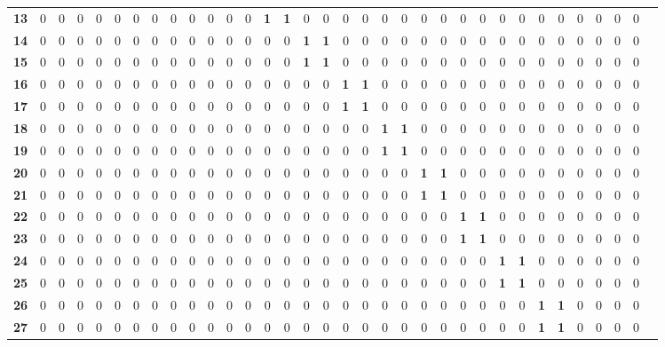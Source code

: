\documentclass[runningheads, a4paper, 10pt]{llncs}
\begin{document}
{\begin{longtabu}{cccccccccccccccccccccccccccccccccc}
\bf{13} & 0 & 0 & 0 & 0 & 0 & 0 & 0 & 0 & 0 & 0 & 0 & 0 & \bf1 & \bf1 & 0 & 0 & 0 & 0 & 0 & 0 & 0 & 0 & 0 & 0 & 0 & 0 & 0 & 0 & 0 & 0 & 0  & 0\\
\bf{14} & 0 & 0 & 0 & 0 & 0 & 0 & 0 & 0 & 0 & 0 & 0 & 0 & 0 & 0 & \bf1 & \bf1 & 0 & 0 & 0 & 0 & 0 & 0 & 0 & 0 & 0 & 0 & 0 & 0 & 0 & 0 & 0  & 0\\
\bf{15} & 0 & 0 & 0 & 0 & 0 & 0 & 0 & 0 & 0 & 0 & 0 & 0 & 0 & 0 & \bf1 & \bf1 & 0 & 0 & 0 & 0 & 0 & 0 & 0 & 0 & 0 & 0 & 0 & 0 & 0 & 0 & 0  & 0\\
\bf{16} & 0 & 0 & 0 & 0 & 0 & 0 & 0 & 0 & 0 & 0 & 0 & 0 & 0 & 0 & 0 & 0 & \bf1 & \bf1 & 0 & 0 & 0 & 0 & 0 & 0 & 0 & 0 & 0 & 0 & 0 & 0 & 0  & 0\\
\bf{17} & 0 & 0 & 0 & 0 & 0 & 0 & 0 & 0 & 0 & 0 & 0 & 0 & 0 & 0 & 0 & 0 & \bf1 & \bf1 & 0 & 0 & 0 & 0 & 0 & 0 & 0 & 0 & 0 & 0 & 0 & 0 & 0  & 0\\
\bf{18} & 0 & 0 & 0 & 0 & 0 & 0 & 0 & 0 & 0 & 0 & 0 & 0 & 0 & 0 & 0 & 0 & 0 & 0 & \bf1 & \bf1 & 0 & 0 & 0 & 0 & 0 & 0 & 0 & 0 & 0 & 0 & 0  & 0\\
\bf{19} & 0 & 0 & 0 & 0 & 0 & 0 & 0 & 0 & 0 & 0 & 0 & 0 & 0 & 0 & 0 & 0 & 0 & 0 & \bf1 & \bf1 & 0 & 0 & 0 & 0 & 0 & 0 & 0 & 0 & 0 & 0 & 0  & 0\\
\bf{20} & 0 & 0 & 0 & 0 & 0 & 0 & 0 & 0 & 0 & 0 & 0 & 0 & 0 & 0 & 0 & 0 & 0 & 0 & 0 & 0 & \bf1 & \bf1 & 0 & 0 & 0 & 0 & 0 & 0 & 0 & 0 & 0  & 0\\
\bf{21} & 0 & 0 & 0 & 0 & 0 & 0 & 0 & 0 & 0 & 0 & 0 & 0 & 0 & 0 & 0 & 0 & 0 & 0 & 0 & 0 & \bf1 & \bf1 & 0 & 0 & 0 & 0 & 0 & 0 & 0 & 0 & 0  & 0\\
\bf{22} & 0 & 0 & 0 & 0 & 0 & 0 & 0 & 0 & 0 & 0 & 0 & 0 & 0 & 0 & 0 & 0 & 0 & 0 & 0 & 0 & 0 & 0 & \bf1 & \bf1 & 0 & 0 & 0 & 0 & 0 & 0 & 0  & 0\\
\bf{23} & 0 & 0 & 0 & 0 & 0 & 0 & 0 & 0 & 0 & 0 & 0 & 0 & 0 & 0 & 0 & 0 & 0 & 0 & 0 & 0 & 0 & 0 & \bf1 & \bf1 & 0 & 0 & 0 & 0 & 0 & 0 & 0  & 0\\
\bf{24} & 0 & 0 & 0 & 0 & 0 & 0 & 0 & 0 & 0 & 0 & 0 & 0 & 0 & 0 & 0 & 0 & 0 & 0 & 0 & 0 & 0 & 0 & 0 & 0 & \bf1 & \bf1 & 0 & 0 & 0 & 0 & 0  & 0\\
\bf{25} & 0 & 0 & 0 & 0 & 0 & 0 & 0 & 0 & 0 & 0 & 0 & 0 & 0 & 0 & 0 & 0 & 0 & 0 & 0 & 0 & 0 & 0 & 0 & 0 & \bf1 & \bf1 & 0 & 0 & 0 & 0 & 0  & 0\\
\bf{26} & 0 & 0 & 0 & 0 & 0 & 0 & 0 & 0 & 0 & 0 & 0 & 0 & 0 & 0 & 0 & 0 & 0 & 0 & 0 & 0 & 0 & 0 & 0 & 0 & 0 & 0 & \bf1 & \bf1 & 0 & 0 & 0  & 0\\
\bf{27} & 0 & 0 & 0 & 0 & 0 & 0 & 0 & 0 & 0 & 0 & 0 & 0 & 0 & 0 & 0 & 0 & 0 & 0 & 0 & 0 & 0 & 0 & 0 & 0 & 0 & 0 & \bf1 & \bf1 & 0 & 0 & 0  & 0\\

\end{longtabu}}
\end{document}
